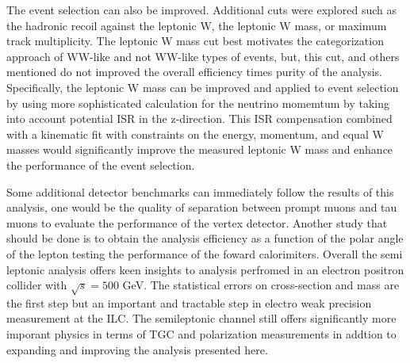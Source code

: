 The event selection can also be improved. Additional cuts were explored such as the hadronic recoil against the leptonic W, the leptonic W mass, or maximum track multiplicity. The leptonic W mass cut best motivates the categorization approach of WW-like and not WW-like types of events, but, this cut, and others mentioned do not improved the overall efficiency times purity of the analysis.  Specifically, the leptonic W mass can be improved and applied to event selection by using more sophisticated calculation for the neutrino momemtum by taking into account potential ISR in the z-direction. This ISR compensation combined with a kinematic fit with constraints on the energy, momentum, and equal W masses would significantly improve the measured leptonic W mass and enhance the performance of the event selection. 
 
Some additional detector benchmarks can immediately follow the results of this analysis, one would be the quality of separation between prompt muons and tau muons to evaluate the performance of the vertex detector. Another study that should be done is to obtain the analysis efficiency as a function of the polar angle of the lepton testing the performance of the foward calorimiters.  Overall the semi leptonic analysis offers keen insights to analysis perfromed in an electron positron collider with $\sqrt{s} = 500$ GeV. The statistical errors on cross-section and mass are the first step but an important and tractable step in electro weak precision measurement at the ILC.  The semileptonic channel still offers significantly more imporant physics in terms of TGC and polarization measurements in addtion to expanding and improving the analysis presented here. 